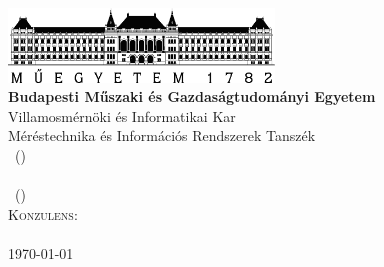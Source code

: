 
\begin{titlepage}

\begin{center}
\includegraphics[width=200pt,keepaspectratio]{figures/BMElogo.png}\\
\vspace{0.3cm}
\textbf{Budapesti Műszaki és Gazdaságtudományi Egyetem}\\
\textmd{Villamosmérnöki és Informatikai Kar}\\
\textmd{Méréstechnika és Információs Rendszerek Tanszék}\\
\textmd{\course \ (\coursecode)}\\[5cm]

{\huge \bfseries \hwtitle}\\[0.8cm]
\vspace{0.5cm}
\textsc{\Large \authorname \ (\authorneptun)}\\[0.8cm]
\vspace{0.5cm}
\textsc{\Large Konzulens: \\[0.1cm]
\vspace{0.1cm} \consultant}
\\[4cm]

\vspace{4cm}
\textsc{\Large \today}\\


\end{center}

\end{titlepage}


